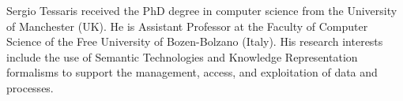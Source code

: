 \documentclass[10pt,journal,compsoc]{IEEEtran}
\theoremstyle{definition}
\theoremstyle{plain}
\begin{document}
\begin{IEEEbiography}{Sergio Tessaris}
received the PhD degree in computer science from the University of Manchester (UK). He is Assistant Professor at the Faculty of Computer Science of the Free University of Bozen-Bolzano (Italy). His research interests include the use of Semantic Technologies and Knowledge Representation formalisms to support the management, access, and exploitation of data and processes.
\end{IEEEbiography}

\vfill
\end{document}
